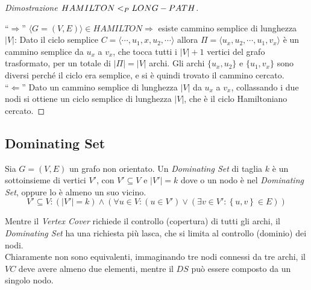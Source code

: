 \begin{proof}[Dimostrazione $HAMILTON <_P LONG-PATH$]
\begin{figure}[H]
\begin{subfigure}[b]{0.45\textwidth}
        \end{subfigure}
    \end{figure}
    ``$\Rightarrow$''
    $
        \langle
        G = (V,E)
        \rangle
        \in HAMILTON
        \Rightarrow
    $ esiste cammino semplice di lunghezza $|V|$:
    Dato il ciclo semplice $
        C = \langle \cdots, u_1, x, u_2, \cdots \rangle
    $ allora $
        \Pi = \langle u_x, u_2, \cdots, u_1, v_x \rangle
    $ è un cammino semplice da $u_x$ a $v_x$, che tocca tutti i $|V|+1$ vertici del grafo trasformato, per un totale di $|\Pi|=|V|$ archi.
    Gli archi $
        \{ u_x, u_2 \}
    $ e $
        \{ u_1, v_x \}
    $ sono diversi perché il ciclo era semplice, e si è quindi trovato il cammino cercato.
    \\
    ``$\Leftarrow$''
    Dato un cammino semplice di lunghezza $|V|$ da $u_x$ a $v_x$, collassando i due nodi si ottiene un ciclo semplice di lunghezza $|V|$, che è il ciclo Hamiltoniano cercato.
\end{proof}

\subsection{Dominating Set}
\begin{definition}
    \label{def:dominatingset}
    Sia $G=(V,E)$ un grafo non orientato.
    Un \emph{Dominating Set} di taglia $k$ è un sottoinsieme di vertici $V'$, con $V' \subseteq V$ e $|V'| = k$ dove o un nodo è nel \emph{Dominating Set}, oppure lo è almeno un suo vicino.
    \begin{equation*}
        V' \subseteq V : 
        \left( |V'| = k \right)
        \wedge
        \left( 
            \forall u \in V :
            \left( u \in V' \right)
            \vee
            \left(
                \exists v \in V' :
                \left\{ u,v \right\} \in E
            \right)
        \right)
    \end{equation*}
\end{definition}
Mentre il \emph{Vertex Cover} richiede il controllo (copertura) di tutti gli archi, il \emph{Dominating Set} ha una richiesta più lasca, che si limita al controllo (dominio) dei nodi.
\\
Chiaramente non sono equivalenti, immaginando tre nodi connessi da tre archi, il $VC$ deve avere almeno due elementi, mentre il $DS$ può essere composto da un singolo nodo.

